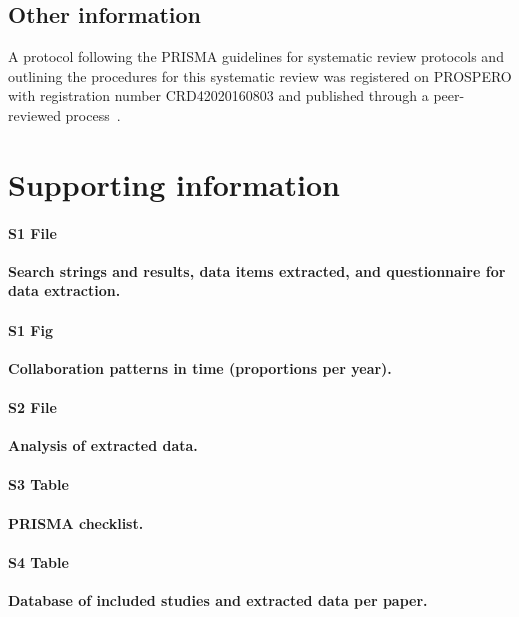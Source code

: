 \documentclass[10pt,letterpaper]{article}
\begin{document}
\subsection*{Other information}
A protocol following the PRISMA guidelines for systematic review protocols and outlining the procedures for this systematic review was registered on PROSPERO with registration number CRD42020160803 and published through a peer-reviewed process~\cite{Azam2020}. 
 
\section*{Supporting information}

\paragraph*{S1 File}
\label{S1_File}
{\bf Search strings and results, data items extracted, and questionnaire for data extraction.} 

\paragraph*{S1 Fig}
\label{S1_Fig}
{\bf Collaboration patterns in time (proportions per year).}

\paragraph*{S2 File}
\label{S2_File}
{\bf Analysis of extracted data.} 

\paragraph*{S3 Table}
\label{S3_Table}
{\bf PRISMA checklist.} 

\paragraph*{S4 Table}
\label{S4_Table}
{\bf Database of included studies and extracted data per paper.} 




\nolinenumbers
\end{document}
